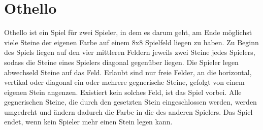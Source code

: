 \section{Othello}

Othello ist ein Spiel für zwei Spieler, in dem es darum geht, am Ende möglichst viele Steine der eigenen Farbe auf einem 8x8 Spielfeld liegen zu haben.
Zu Beginn des Spiels liegen auf den vier mittleren Feldern jeweils zwei Steine jedes Spielers, sodass die Steine eines Spielers diagonal gegenüber liegen.
Die Spieler legen abwechseld Steine auf das Feld.
Erlaubt sind nur freie Felder, an die horizontal, vertikal oder diagonal ein oder mehrere gegnerische Steine, gefolgt von einem eigenen Stein angenzen.
Existiert kein solches Feld, ist das Spiel vorbei.
Alle gegnerischen Steine, die durch den gesetzten Stein eingeschlossen werden, werden umgedreht und ändern dadurch die Farbe in die des anderen Spielers.
Das Spiel endet, wenn kein Spieler mehr einen Stein legen kann.
\cite{worldothellorules}
